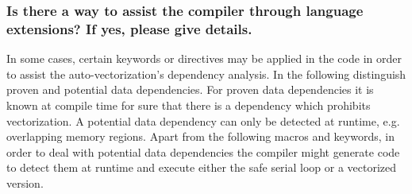 \documentclass[11pt]{article}
\begin{document}
\subsubsection*{Is there a way to assist the compiler through language extensions? If yes, please give details.}
In some cases, certain keywords or directives may be applied in the code in order to assist the auto-vectorization's dependency analysis. In the following distinguish proven and potential data dependencies. For proven data dependencies it is known at compile time for sure that there is a dependency which prohibits vectorization. A potential data dependency can only be detected at runtime, e.g. overlapping memory regions. Apart from the following macros and keywords, in order to deal with potential data dependencies the compiler might generate code to detect them at runtime and execute either the safe serial loop or a vectorized version.
\end{document}
